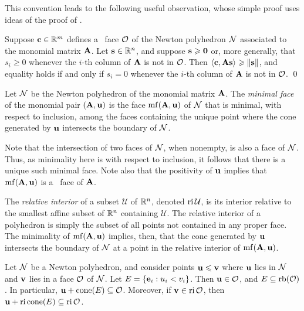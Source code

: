 \documentclass{article}
\begin{document}
This convention leads to the following useful observation, whose simple proof uses ideas of the proof of .

\begin{proposition}
   \label{prop: inner product with columns of A}
   Suppose $\mathbf{c} \in \mathbb{R}^m$ defines a \positive\ face $\mathcal{O}$ of the Newton polyhedron $\mathcal{N}$ associated to the monomial matrix $\mathbf{A}$.
   Let $\mathbf{s} \in \mathbb{R}^n$, and suppose $\mathbf{s} \geqslant \mathbf{0}$ or, more generally, that $s_i \ge 0$ whenever the $i$-th column of $\mathbf{A}$ is not in $\mathcal{O}$.
   Then $\langle \mathbf{c}, \mathbf{A}\mathbf{s} \rangle \geqslant \| \mathbf{s} \|$, and equality holds if and only if $s_i = 0$ whenever the $i$-th column of $\mathbf{A}$ is not in $\mathcal{O}$.
   \qed
\end{proposition}

\begin{definition}
   Let $\mathcal{N}$ be the Newton polyhedron of the monomial matrix $\mathbf{A}$.
   The \emph{minimal face} of the monomial pair $(\mathbf{A}, \mathbf{u})$ is the face $\operatorname{mf}(\mathbf{A}, \mathbf{u})$ of $\mathcal{N}$ that is minimal, with respect to inclusion, among the faces containing the unique point where the cone generated by $\mathbf{u}$ intersects the boundary of $\mathcal{N}$.
\end{definition}

Note that the intersection of two faces of $\mathcal{N}$, when nonempty, is also a face of $\mathcal{N}$.
Thus, as minimality here is with respect to inclusion, it follows that there is a unique such minimal face.
Note also that the positivity of $\mathbf{u}$ implies that $\operatorname{mf}(\mathbf{A},\mathbf{u})$ is a \positive\ face of $\mathbf{A}$.

The \emph{relative interior} of a subset $\mathcal{U}$ of $\mathbb{R}^n$, denoted $\operatorname{ri} \mathcal{U}$, is its interior relative to the smallest affine subset of $\mathbb{R}^n$ containing $\mathcal{U}$.
The relative interior of a polyhedron is simply the subset of all points not contained in any proper face.
The minimality of $\operatorname{mf}(\mathbf{A},\mathbf{u})$ implies, then, that the cone generated by $\mathbf{u}$ intersects the boundary of $\mathcal{N}$ at a point in the relative interior of $\operatorname{mf}(\mathbf{A},\mathbf{u})$.

\begin{proposition}
   \label{prop: a property of the boundary}
   Let $\mathcal{N}$ be a Newton polyhedron, and consider points $\mathbf{u} \leqslant \mathbf{v}$ where $\mathbf{u}$ lies in  $\mathcal{N}$ and $\mathbf{v}$ lies in a face $\mathcal{O}$ of $\mathcal{N}$.
   Let $E = \{\mathbf{e}_i : u_i < v_i\}$.
   Then $\mathbf{u}\in\mathcal{O}$, and $E \subseteq \operatorname{rb}(\mathcal{O})$.
   In particular, $\mathbf{u} + \operatorname{cone}(E) \subseteq \mathcal{O}$.
   Moreover, if $\mathbf{v}\in \operatorname{ri}\mathcal{O}$, then $\mathbf{u} + \operatorname{ri} \operatorname{cone}(E) \subseteq \operatorname{ri}\mathcal{O}$.
\end{proposition}
\end{document}
